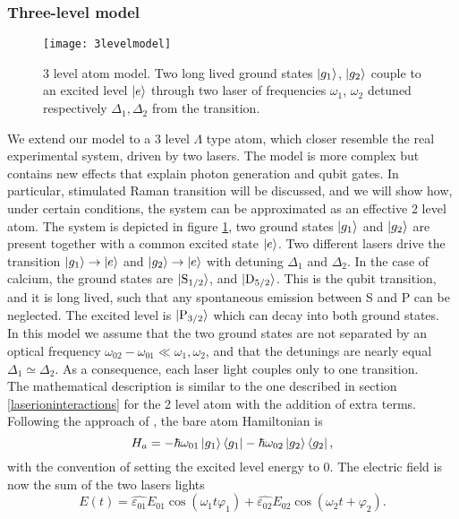 \subsubsection{Three-level model}
\label{sec:threelevel}
\begin{figure}
\centering
\texttt{[image: 3levelmodel]}
\caption{3 level atom model. Two long lived ground states $\ket{g_1}$, $\ket{g_2}$ couple to an excited level $\ket{e}$ through two laser of frequencies $\omega_1$, $\omega_2$ detuned respectively $\Delta_1,\Delta_2$ from the transition.}
\label{3levelmodel}
\end{figure}
We extend our model to a 3 level $\Lambda$ type atom, which closer resemble the real experimental system, driven by two lasers. The model is more complex but contains new effects that explain photon generation and qubit gates. In particular, stimulated Raman transition will be discussed, and we will show how, under certain conditions, the system can be approximated as an effective 2 level atom. The system is depicted in figure \ref{3levelmodel}, two ground states $\ket{g_1}$ and $\ket{g_2}$ are present together with a common excited state $\ket{e}$. Two different lasers drive the transition $\ket{g_1} \to \ket{e}$ and $\ket{g_2} \to \ket{e}$ with detuning $\Delta_1$ and $\Delta_2$. In the case of calcium, the ground states are $\ket{\text{S}_{1/2}}$, and $\ket{\text{D}_{5/2}}$. This is the qubit transition, and it is long lived, such that any spontaneous emission between S and P can be neglected. The excited level is $\ket{\text{P}_{3/2}}$ which can decay into both ground states.\\
In this model we assume that the two ground states are not separated by an optical frequency $\omega_{02} - \omega_{01} \ll \omega_1,\omega_2$, and that the detunings are nearly equal $\Delta_1 \simeq \Delta_2$. As a consequence, each laser light couples only to one transition.\\
The mathematical description is similar to the one described in section \ref{laserioninteractions} for the 2 level atom with the addition of extra terms. Following the approach of \cite{steck}, the bare atom Hamiltonian is
\begin{equation}
H_a = -\hbar \omega_{01}\ket{g_1}\bra{g_1} - \hbar \omega_{02}\ket{g_2}\bra{g_2},
\end{equation}
with the convention of setting the excited level energy to 0. The electric field is now the sum of the two lasers lights
\begin{equation}
E(t) = \hat{\varepsilon_{01}} E_{01} \cos(\omega_{1} t \varphi_1) + \hat{\varepsilon_{02}} E_{02} \cos(\omega_2 t + \varphi_2).
\end{equation}
